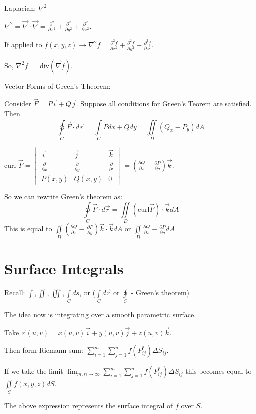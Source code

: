 \documentclass[../calc3.tex]{subfiles}
\begin{document}
Laplacian: $\nabla^2$

$\nabla^2 = \vec{\nabla}\cdot \vec{\nabla}=\frac{\partial^2}{\partial x^2}+\frac{\partial^2}{\partial y^2}+\frac{\partial^2}{\partial z^2}$.

If applied to $f(x,y,z)\rightarrow \nabla^2 f = \frac{\partial^2 f}{\partial x^2}+\frac{\partial^2 f}{\partial y^2}+\frac{\partial^2 f}{\partial z^2}$.

So, $\nabla^2 f =$ div$(\vec{\nabla}f)$.

Vector Forms of Green's Theorem:

Consider $\vec{F}=P\vec{i}+Q\vec{j}$. Suppose all conditions for Green's Teorem are satisfied. Then 
\[ \oint\limits_{C}\vec{F}\cdot d\vec{r}=\int\limits_{C}Pdx+Qdy=\iint\limits_{D}(Q_x-P_y)dA \]

curl $\vec{F} = \begin{vmatrix}
    \vec{i} & \vec{j} & \vec{k}\\
    \frac{\partial}{\partial x} & \frac{\partial}{\partial y} & \frac{\partial}{\partial t}\\
    P(x,y) & Q(x,y) & 0
\end{vmatrix} = \left(\frac{\partial Q}{\partial x}-\frac{\partial P}{\partial y}\right)\vec{k}$.

So we can rewrite Green's theorem as: 
\[ \oint\limits_{C}\vec{F}\cdot d\vec{r}=\iint\limits_{D}(\text{curl}\vec{F})\cdot \vec{k}dA \]
This is equal to $\iint\limits_{D}\left(\frac{\partial Q}{\partial x}-\frac{\partial P}{\partial y}\right)\vec{k}\cdot \vec{k}dA$ or $\iint\limits_{D}\frac{\partial Q}{\partial x}-\frac{\partial P}{\partial y}dA$.

\section{Surface Integrals}
Recall: $\int, \iint, \iiint, \int\limits_{C}ds$, or ($\int\limits_{C}d\vec{r}$ or $\oint\limits_{C}$ - Green's theorem)

The idea now is integrating over a smooth parametric surface.

Take $\vec{r}(u,v)=x(u,v)\vec{i}+y(u,v)\vec{j}+z(u,v)\vec{k}$.

Then form Riemann sum: $\sum_{i=1}^m\sum_{j=1}^n f\left(P_{ij}^*\right)\Delta S_{ij}$.

If we take the limit $\lim_{m,n\to \infty}\sum_{i=1}^m\sum_{j=1}^n f\left(P_{ij}^*\right)\Delta S_{ij}$ this becomes equal to $\iint\limits_{S}f(x,y,z)dS$.

The above expression represents the surface integral of $f$ over $S$.
\end{document}
